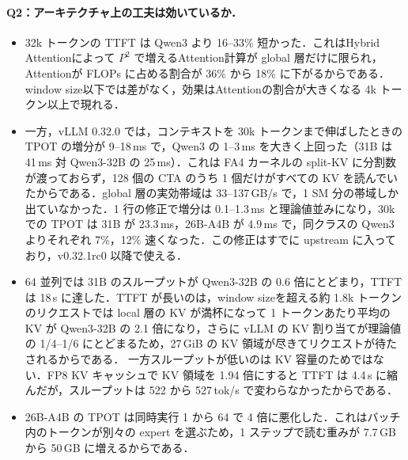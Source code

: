 \paragraph{Q2：アーキテクチャ上の工夫は効いているか．}
\begin{itemize}
\item 32k トークンの TTFT は Qwen3 より 16--33\% 短かった．これはHybrid Attentionによって $P^2$ で増えるAttention計算が global 層だけに限られ，Attentionが FLOPs に占める割合が 36\% から 18\% に下がるからである．window size以下では差がなく，効果はAttentionの割合が大きくなる 4k トークン以上で現れる．
\item 一方，vLLM 0.32.0 では，コンテキストを 30k トークンまで伸ばしたときの TPOT の増分が 9--18\,ms で，Qwen3 の 1--3\,ms を大きく上回った（31B は 41\,ms 対 Qwen3-32B の 25\,ms）．これは FA4 カーネルの split-KV に分割数が渡っておらず，128 個の CTA のうち 1 個だけがすべての KV を読んでいたからである．global 層の実効帯域は 33--137\,GB/s で，1 SM 分の帯域しか出ていなかった．1 行の修正で増分は 0.1--1.3\,ms と理論値並みになり，30k での TPOT は 31B が 23.3\,ms，26B-A4B が 4.9\,ms で，同クラスの Qwen3 よりそれぞれ 7\%，12\% 速くなった．この修正はすでに upstream に入っており，v0.32.1rc0 以降で使える．
\item 64 並列では 31B のスループットが Qwen3-32B の 0.6 倍にとどまり，TTFT は 18\,s に達した．TTFT が長いのは，window sizeを超える約 1.8k トークンのリクエストでは local 層の KV が満杯になって 1 トークンあたり平均の KV が Qwen3-32B の 2.1 倍になり，さらに vLLM の KV 割り当てが理論値の 1/4--1/6 にとどまるため，27\,GiB の KV 領域が尽きてリクエストが待たされるからである．
      一方スループットが低いのは KV 容量のためではない．FP8 KV キャッシュで KV 領域を 1.94 倍にすると TTFT は 4.4\,s に縮んだが，スループットは 522 から 527\,tok/s で変わらなかったからである．
\item 26B-A4B の TPOT は同時実行 1 から 64 で 4 倍に悪化した．これはバッチ内のトークンが別々の expert を選ぶため，1 ステップで読む重みが 7.7\,GB から 50\,GB に増えるからである．
\end{itemize}

